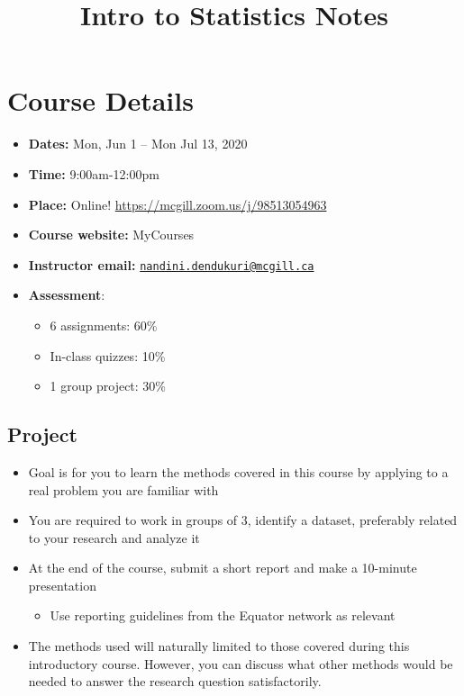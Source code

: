 \documentclass[
]{book}
\title{Intro to Statistics Notes}
\author{}
\date{\vspace{-2.5em}}
\providecommand{\tightlist}{%
  \setlength{\itemsep}{0pt}\setlength{\parskip}{0pt}}
\begin{document}
\maketitle

{
\setcounter{tocdepth}{1}
\tableofcontents
}
\hypertarget{course-details}{%
\chapter*{Course Details}\label{course-details}}

\begin{itemize}
\item
  \textbf{Dates:} Mon, Jun 1 -- Mon Jul 13, 2020
\item
  \textbf{Time:} 9:00am-12:00pm
\item
  \textbf{Place:} Online! \url{https://mcgill.zoom.us/j/98513054963}
\item
  \textbf{Course website:} MyCourses
\item
  \textbf{Instructor email:} \href{mailto:nandini.dendukuri@mcgill.ca}{\nolinkurl{nandini.dendukuri@mcgill.ca}}
\item
  \textbf{Assessment}:

  \begin{itemize}
  \tightlist
  \item
    6 assignments: 60\%
  \item
    In-class quizzes: 10\%
  \item
    1 group project: 30\%
  \end{itemize}
\end{itemize}

\hypertarget{project}{%
\section*{Project}\label{project}}

\begin{itemize}
\tightlist
\item
  Goal is for you to learn the methods covered in this course by applying to a real problem you are familiar with
\item
  You are required to work in groups of 3, identify a dataset, preferably related to your research and analyze it
\item
  At the end of the course, submit a short report and make a 10-minute presentation

  \begin{itemize}
  \tightlist
  \item
    Use reporting guidelines from the Equator network as relevant
  \end{itemize}
\item
  The methods used will naturally limited to those covered during this introductory course. However, you can discuss what other methods would be needed to answer the research question satisfactorily.
\end{itemize}
\end{document}
